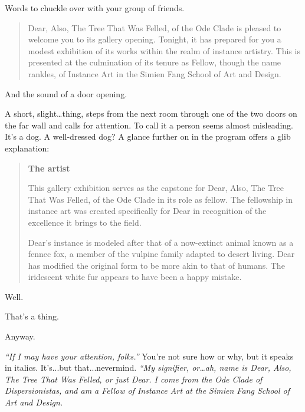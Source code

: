 Words to chuckle over with your group of friends.

\begin{quote}
Dear, Also, The Tree That Was Felled, of the Ode Clade is pleased to welcome you to its gallery opening. Tonight, it has prepared for you a modest exhibition of its works within the realm of instance artistry. This is presented at the culmination of its tenure as Fellow, though the name rankles, of Instance Art in the Simien Fang School of Art and Design.
\end{quote}

And the sound of a door opening.

\vfill

\newpage

A short, slight\ldots{}thing, steps from the next room through one of the two doors on the far wall and calls for attention. To call it a person seems almost misleading. It's a dog. A well-dressed dog? A glance further on in the program offers a glib explanation:

\begin{quote}
\textbf{The artist}

This gallery exhibition serves as the capstone for Dear, Also, The Tree That Was Felled, of the Ode Clade in its role as fellow. The fellowship in instance art was created specifically for Dear in recognition of the excellence it brings to the field.

Dear's instance is modeled after that of a now-extinct animal known as a fennec fox, a member of the vulpine family adapted to desert living. Dear has modified the original form to be more akin to that of humans. The iridescent white fur appears to have been a happy mistake.
\end{quote}

\newpage

\null
\vfill

Well.

\null
\vfill

\newpage

\null
\vfill

That's a thing.

\null
\vfill

\newpage

\null
\vfill

Anyway.

\null
\vfill

\newpage

\emph{``If I may have your attention, folks.''} You're not sure how or why, but it speaks in italics. It's...but that...nevermind. \emph{``My signifier, or\ldots{}ah, name is Dear, Also, The Tree That Was Felled, or just Dear. I come from the Ode Clade of Dispersionistas, and am a Fellow of Instance Art at the Simien Fang School of Art and Design.}

